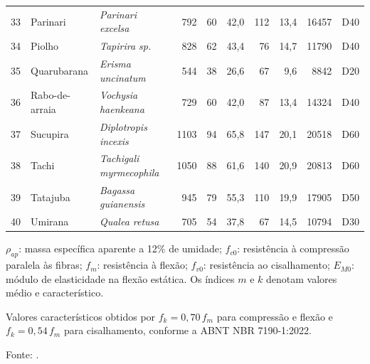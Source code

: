 \begin{table}[!ht]
\begin{threeparttable}
\begin{tabular*}{\textwidth}{@{\extracolsep{\fill}}rllrrrrrrr@{\extracolsep{\fill}}}
33 & Parinari & \textit{Parinari excelsa} & 792 & 60 & 42,0 & 112 & 13,4 & 16457 & D40 \\
34 & Piolho & \textit{Tapirira sp.} & 828 & 62 & 43,4 & 76 & 14,7 & 11790 & D40 \\
35 & Quarubarana & \textit{Erisma uncinatum} & 544 & 38 & 26,6 & 67 & 9,6 & 8842 & D20 \\
36 & Rabo-de-arraia & \textit{Vochysia haenkeana} & 729 & 60 & 42,0 & 87 & 13,4 & 14324 & D40 \\
37 & Sucupira & \textit{Diplotropis incexis} & 1103 & 94 & 65,8 & 147 & 20,1 & 20518 & D60 \\
38 & Tachi & \textit{Tachigali myrmecophila} & 1050 & 88 & 61,6 & 140 & 20,9 & 20813 & D60 \\
39 & Tatajuba & \textit{Bagassa guianensis} & 945 & 79 & 55,3 & 110 & 19,9 & 17905 & D50 \\
40 & Umirana & \textit{Qualea retusa} & 705 & 54 & 37,8 & 67 & 14,5 & 10794 & D30 \\
\bottomrule
\end{tabular*}
\begin{tablenotes}\footnotesize
\item $\rho_{ap}$: massa específica aparente a 12\% de umidade; $f_{c0}$: resistência à compressão paralela às fibras; $f_{m}$: resistência à flexão; $f_{v0}$: resistência ao cisalhamento; $E_{M0}$: módulo de elasticidade na flexão estática. Os índices $m$ e $k$ denotam valores médio e característico.
\item Valores característicos obtidos por $f_k = 0{,}70\,f_m$ para compressão e flexão e $f_k = 0{,}54\,f_m$ para cisalhamento, conforme a ABNT NBR 7190-1:2022. 
\item Fonte:  \textcite{Wolenski2020}.
\end{tablenotes}
\end{threeparttable}
\end{table}
